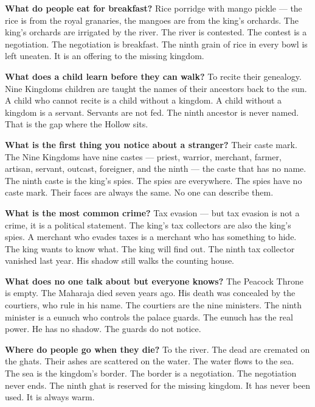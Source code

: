\vspace{1em}

\begin{almanac}
\textbf{What do people eat for breakfast?} Rice porridge with mango pickle --- the rice is from the royal granaries, the mangoes are from the king's orchards. The king's orchards are irrigated by the river. The river is contested. The contest is a negotiation. The negotiation is breakfast. The ninth grain of rice in every bowl is left uneaten. It is an offering to the missing kingdom.

\textbf{What does a child learn before they can walk?} To recite their genealogy. Nine Kingdoms children are taught the names of their ancestors back to the sun. A child who cannot recite is a child without a kingdom. A child without a kingdom is a servant. Servants are not fed. The ninth ancestor is never named. That is the gap where the Hollow sits.

\textbf{What is the first thing you notice about a stranger?} Their caste mark. The Nine Kingdoms have nine castes --- priest, warrior, merchant, farmer, artisan, servant, outcast, foreigner, and the ninth --- the caste that has no name. The ninth caste is the king's spies. The spies are everywhere. The spies have no caste mark. Their faces are always the same. No one can describe them.

\textbf{What is the most common crime?} Tax evasion --- but tax evasion is not a crime, it is a political statement. The king's tax collectors are also the king's spies. A merchant who evades taxes is a merchant who has something to hide. The king wants to know what. The king will find out. The ninth tax collector vanished last year. His shadow still walks the counting house.

\textbf{What does no one talk about but everyone knows?} The Peacock Throne is empty. The Maharaja died seven years ago. His death was concealed by the courtiers, who rule in his name. The courtiers are the nine ministers. The ninth minister is a eunuch who controls the palace guards. The eunuch has the real power. He has no shadow. The guards do not notice.

\textbf{Where do people go when they die?} To the river. The dead are cremated on the ghats. Their ashes are scattered on the water. The water flows to the sea. The sea is the kingdom's border. The border is a negotiation. The negotiation never ends. The ninth ghat is reserved for the missing kingdom. It has never been used. It is always warm.


\end{almanac}

